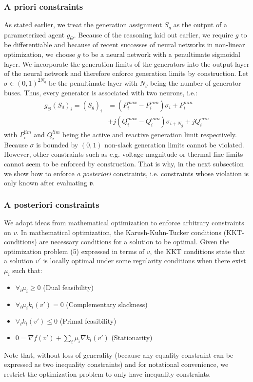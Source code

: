 \subsubsection{A priori constraints}
As stated earlier, we treat the generation assignment $S_g$ as the output of a parameterized agent $g_\Theta$. Because of the reasoning laid out earlier, we require $g$ to be differentiable and because of recent successes of neural networks in non-linear optimization, we choose $g$ to be a neural network with a penultimate sigmoidal layer. We incorporate the generation limits of the generators into the output layer of the neural network and therefore enforce generation limits by construction. Let $\sigma \in (0,1)^{2N_g}$ be the penultimate layer with $N_g$ being the number of generator buses. Thus, every generator is associated with two neurons, i.e.:
\begin{align*}
g_\Theta(S_d)_i = (S_g)_i &= (P_i^{max} - P_i^{min})\sigma_i + P_i^{min}\\
 &+ j(Q_i^{max} - Q_i^{min})\sigma_{i+N_g}  + jQ_i^{min}
\end{align*}
with $P^{lim}_i$ and $Q_i^{lim}$ being the active and reactive generation limit respectively. Because $\sigma$ is bounded by $(0,1)$ non-slack generation limits cannot be violated. However, other constraints such as e.g. voltage magnitude or thermal line limits cannot seem to be enforced by construction. That is why, in the next subsection we show how to enforce \emph{a posteriori} constraints, i.e. constraints whose violation is only known after evaluating $\mathfrak{v}$.


\subsubsection{A posteriori constraints}
We adapt ideas from mathematical optimization to enforce arbitrary constraints on $v$. In mathematical optimization, the Karush-Kuhn-Tucker conditions (KKT-conditions) are necessary conditions for a solution to be optimal. Given the optimization problem (5) expressed in terms of $v$, the KKT conditions state that a solution $v'$ is locally optimal under some regularity conditions when there exist $\mu_i$ such that:
\begin{itemize}
\item $\forall_i \mu_i \geq 0$ (Dual feasibility)
\item $\forall_i \mu_i k_i(v') = 0$ (Complementary slackness)
\item $\forall_i k_i(v') \leq 0$ (Primal feasibility)
\item $0 =\nabla f(v') + \sum_i \mu_i \nabla k_i(v')$ (Stationarity)
\end{itemize}
Note that, without loss of generality (because any equality constraint can be expressed as two inequality constraints) and for notational convenience, we restrict the optimization problem to only have inequality constraints.

